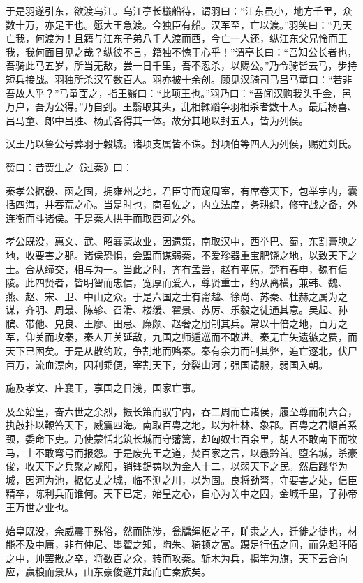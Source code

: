 \documentclass[]{article}
\begin{document}
于是羽遂引东，欲渡乌江。乌江亭长檥船待，谓羽曰：``江东虽小，地方千里，众数十万，亦足王也。愿大王急渡。今独臣有船。汉军至，亡以渡。''羽笑曰：``乃天亡我，何渡为！且籍与江东子弟八千人渡而西，今亡一人还，纵江东父兄怜而王我，我何面目见之哉？纵彼不言，籍独不愧于心乎！''谓亭长曰：``吾知公长者也，吾骑此马五岁，所当无敌，尝一日千里，吾不忍杀，以赐公。''乃令骑皆去马，步持短兵接战。羽独所杀汉军数百人。羽亦被十余创。顾见汉骑司马吕马童曰：``若非吾故人乎？''马童面之，指王翳曰：``此项王也。''羽乃曰：``吾闻汉购我头千金，邑万户，吾为公得。''乃自刭。王翳取其头，乱相輮蹈争羽相杀者数十人。最后杨喜、吕马童、郎中吕胜、杨武各得其一体。故分其地以封五人，皆为列侯。

汉王乃以鲁公号葬羽于穀城。诸项支属皆不诛。封项伯等四人为列侯，赐姓刘氏。

赞曰：昔贾生之《过秦》曰：

秦孝公据殽、函之固，拥雍州之地，君臣守而窥周室，有席卷天下，包举宇内，囊括四海，并吞荒之心。当是时也，商君佐之，内立法度，务耕织，修守战之备，外连衡而斗诸侯。于是秦人拱手而取西河之外。

孝公既没，惠文、武、昭襄蒙故业，因遗策，南取汉中，西举巴、蜀，东割膏腴之地，收要害之郡。诸侯恐惧，会盟而谋弱秦，不爱珍器重宝肥饶之地，以致天下之士。合从缔交，相与为一。当此之时，齐有孟尝，赵有平原，楚有春申，魏有信陵。此四贤者，皆明智而忠信，宽厚而爱人，尊贤重士，约从离横，兼韩、魏、燕、赵、宋、卫、中山之众。于是六国之士有甯越、徐尚、苏秦、杜赫之属为之谋，齐明、周最、陈轸、召滑、楼缓、翟景、苏厉、乐毅之徒通其意。吴起、孙膑、带他、皃良、王廖、田忌、廉颇、赵奢之朋制其兵。常以十倍之地，百万之军，仰关而攻秦，秦人开关延敌，九国之师遁巡而不敢进。秦无亡矢遗镞之费，而天下已困矣。于是从散约败，争割地而赂秦。秦有余力而制其弊，追亡逐北，伏尸百万，流血漂卤，因利乘便，宰割天下，分裂山河；强国请服，弱国入朝。

施及孝文、庄襄王，享国之日浅，国家亡事。

及至始皇，奋六世之余烈，振长策而驭宇内，吞二周而亡诸侯，履至尊而制六合，执敲扑以鞭笞天下，威震四海。南取百粤之地，以为桂林、象郡。百粤之君頫首系颈，委命下吏。乃使蒙恬北筑长城而守藩篱，却匈奴七百余里，胡人不敢南下而牧马，士不敢弯弓而报怨。于是废先王之道，焚百家之言，以愚黔首。堕名城，杀豪俊，收天下之兵聚之咸阳，销锋鍉铸以为金人十二，以弱天下之民。然后践华为城，因河为池，据亿丈之城，临不测之川，以为固。良将劲弩，守要害之处，信臣精卒，陈利兵而谁何。天下已定，始皇之心，自心为关中之固，金城千里，子孙帝王万世之业也。

始皇既没，余威震于殊俗，然而陈涉，瓮牖绳枢之子，甿隶之人，迁徙之徒也，材能不及中庸，非有仲尼、墨翟之知，陶朱、猗顿之富。蹑足行伍之间，而免起阡陌之中，帅罢散之卒，将数百之众，转而攻秦。斩木为兵，揭竿为旗，天下云合向应，赢粮而景从，山东豪俊遂并起而亡秦族矣。
\end{document}
